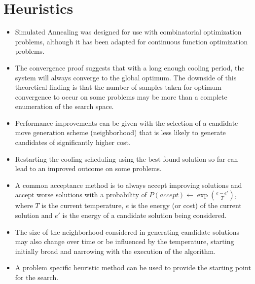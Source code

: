\documentclass[a4paper, 11pt]{article}
\begin{document}
\section{Heuristics}
\label{sec:heuristics}
\begin{itemize}
	\item Simulated Annealing was designed for use with combinatorial optimization problems, although it has been adapted for continuous function optimization problems.
	\item The convergence proof suggests that with a long enough cooling period, the system will always converge to the global optimum. The downside of this theoretical finding is that the number of samples taken for optimum convergence to occur on some problems may be more than a complete enumeration of the search space. 
	\item Performance improvements can be given with the selection of a candidate move generation scheme (neighborhood) that is less likely to generate candidates of significantly higher cost.
	\item Restarting the cooling scheduling using the best found solution so far can lead to an improved outcome on some problems.
	\item A common acceptance method is to always accept improving solutions and accept worse solutions with a probability of $P(accept) \leftarrow \exp(\frac{e-e\prime}{T})$, where $T$ is the current temperature, $e$ is the energy (or cost) of the current solution and $e\prime$ is the energy of a candidate solution being considered.
	\item The size of the neighborhood considered in generating candidate solutions may also change over time or be influenced by the temperature, starting initially broad and narrowing with the execution of the algorithm.
	\item A problem specific heuristic method can be used to provide the starting point for the search.
\end{itemize}
\end{document}
